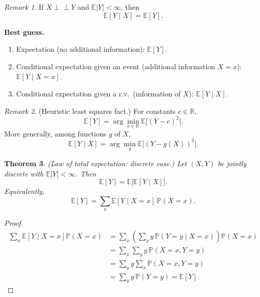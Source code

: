\documentclass[11pt]{article}
\theoremstyle{plain}
\newtheorem{theorem}{Theorem}[section]
\theoremstyle{definition}
\theoremstyle{remark}
\newtheorem{remark}[theorem]{Remark}
\newcommand{\R}{\mathbb{R}}
\begin{document}
	\begin{remark}
		If \(X\perp\!\!\!\perp Y\) and \(\mathbb{E}|Y|<\infty\), then
		\[
		\mathbb{E}[Y\mid X]=\mathbb{E}[Y].
		\]
	\end{remark}
	
	
	\textbf{Best guess.}
	\begin{enumerate}[label=\arabic*)]
		\item Expectation (no additional information): \(\mathbb{E}[Y]\).
		\item Conditional expectation given an event (additional information \(X=x\)):
		\(\mathbb{E}[Y\mid X=x]\).
		\item Conditional expectation given a r.v.\ (information of \(X\)):
		\(\mathbb{E}[Y\mid X]\).
	\end{enumerate}
	
	\begin{remark}
		(Heuristic least squares fact.)
		For constants \(c\in\R\),
		\[
		\mathbb{E}[Y]=\arg\min_{c\in\R}\mathbb{E}\big[(Y-c)^2\big].
		\]
		More generally, among functions \(g\) of \(X\),
		\[
		\mathbb{E}[Y\mid X]=\arg\min_{g}\mathbb{E}\big[(Y-g(X))^2\big].
		\]
	\end{remark}
	
	
	
	\begin{theorem}
		(Law of total expectation: discrete case.)
		Let \((X,Y)\) be jointly discrete with \(\mathbb{E}|Y|<\infty\). Then
		\[
		\mathbb{E}[Y]=\mathbb{E}\!\big[\mathbb{E}[Y\mid X]\big].
		\]
		Equivalently,
		\[
		\mathbb{E}[Y]=\sum_{x}\mathbb{E}[Y\mid X=x]\ \mathbb{P}(X=x).
		\]
	\end{theorem}
	
	\begin{proof}
		\begin{align*}
			\sum_{x}\mathbb{E}[Y\mid X=x]\mathbb{P}(X=x)
			&=\sum_{x}\left(\sum_{y} y\,\mathbb{P}(Y=y\mid X=x)\right)\mathbb{P}(X=x)\\
			&=\sum_{x}\sum_{y} y\,\mathbb{P}(X=x,Y=y)\\
			&=\sum_{y} y\sum_{x}\mathbb{P}(X=x,Y=y)\\
			&=\sum_{y} y\,\mathbb{P}(Y=y)
			=\mathbb{E}[Y].
		\end{align*}
	\end{proof}
	
	
\end{document}
